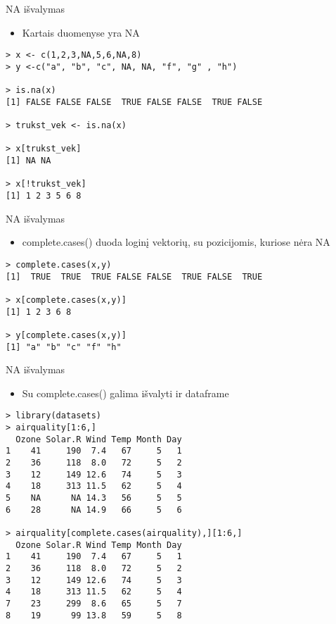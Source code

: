 \documentclass[11pt,xcolor=table]{beamer}
\begin{document}

\begin{frame}[fragile]{NA išvalymas}
\begin{itemize}
\item Kartais duomenyse yra NA
\end{itemize}
\begin{lstlisting}
> x <- c(1,2,3,NA,5,6,NA,8)
> y <-c("a", "b", "c", NA, NA, "f", "g" , "h")

> is.na(x)
[1] FALSE FALSE FALSE  TRUE FALSE FALSE  TRUE FALSE

> trukst_vek <- is.na(x)

> x[trukst_vek]
[1] NA NA

> x[!trukst_vek]
[1] 1 2 3 5 6 8
\end{lstlisting}
\end{frame}


\begin{frame}[fragile]{NA išvalymas}
\begin{itemize}
\item complete.cases() duoda loginį vektorių, su pozicijomis, kuriose nėra NA
\end{itemize}
\begin{lstlisting}
> complete.cases(x,y)
[1]  TRUE  TRUE  TRUE FALSE FALSE  TRUE FALSE  TRUE

> x[complete.cases(x,y)]
[1] 1 2 3 6 8

> y[complete.cases(x,y)]
[1] "a" "b" "c" "f" "h"
\end{lstlisting}
\end{frame}


\begin{frame}[fragile]{NA išvalymas}
\begin{itemize}
\item Su complete.cases() galima išvalyti ir dataframe
\end{itemize}
\begin{lstlisting}
> library(datasets)
> airquality[1:6,]
  Ozone Solar.R Wind Temp Month Day
1    41     190  7.4   67     5   1
2    36     118  8.0   72     5   2
3    12     149 12.6   74     5   3
4    18     313 11.5   62     5   4
5    NA      NA 14.3   56     5   5
6    28      NA 14.9   66     5   6

> airquality[complete.cases(airquality),][1:6,]
  Ozone Solar.R Wind Temp Month Day
1    41     190  7.4   67     5   1
2    36     118  8.0   72     5   2
3    12     149 12.6   74     5   3
4    18     313 11.5   62     5   4
7    23     299  8.6   65     5   7
8    19      99 13.8   59     5   8
\end{lstlisting}
\end{frame}
\end{document}
